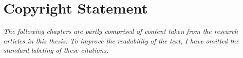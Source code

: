 \documentclass[10pt, twoside, a4paper, hidelinks]{report}
\begin{document}


\setcounter{tocdepth}{2}




\fancyhead{}
\fancyhead[L]{\leftmark}
\fancyhead[RE]{\rightmark}
\fancyhead[LO,RE]{\thepage}
\fancyfoot{}



\renewcommand{\contentsname}{Table of Contents}
\tableofcontents

\listoffigures
\clearpage

\listoftables
\vfill
\section*{Copyright Statement}

\textit{The following chapters are partly comprised of content taken from the research articles in this thesis. 
To improve the readability of the text, I have omitted the standard labeling of these citations.}
\clearpage


\setlength{\parskip}{0.5em} 

\clearpage
{}  
\setcounter{page}{1}


\clearpage


\clearpage


\clearpage

\clearpage

\clearpage

\printbibliography[notcategory=ignore,heading=bibintoc]
\newpage



\clearpage
\captionsetup[figure]{list=no}
\captionsetup[table]{list=no}


\end{document}
